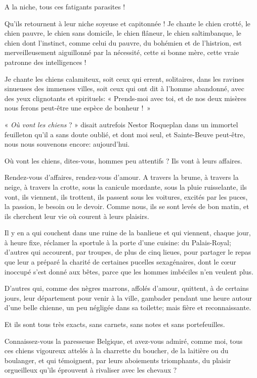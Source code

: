 A la niche, tous ces fatigants parasites !

Qu’ils retournent à leur niche soyeuse et capitonnée !
Je chante le chien crotté, le chien pauvre, le chien sans domicile, le
chien flâneur, le chien saltimbanque, le chien dont
l’instinct, comme celui du pauvre, du bohémien et de
l’histrion, est merveilleusement aiguillonné par la
nécessité, cette si bonne mère, cette vraie patronne des intelligences
!

Je chante les chiens calamiteux, soit ceux qui errent, solitaires, dans
les ravines sinueuses des immenses villes, soit ceux qui ont dit à
l’homme abandonné, avec des yeux clignotants et
spirituels: « Prends{}-moi avec toi, et de nos deux misères nous ferons
peut{}-être une espèce de bonheur !~»

« \textit{Où vont les chiens} ? » disait autrefois Nestor Roqueplan dans un
immortel feuilleton qu’il a sans doute oublié, et dont
moi seul, et Sainte{}-Beuve peut{}-être, nous nous souvenons encore:
aujourd’hui.

Où vont les chiens, dites{}-vous, hommes peu attentifs ? Ils vont à
leurs affaires.

Rendez{}-vous d’affaires, rendez{}-vous
d’amour. A travers la brume, à travers la neige, à
travers la crotte, sous la canicule mordante, sous la pluie
ruisselante, ils vont, ils viennent, ils trottent, ils passent sous les
voitures, excités par les puces, la passion, le besoin ou le devoir.
Comme nous, ils se sont levés de bon matin, et ils cherchent leur vie
où courent à leurs plaisirs.

Il y en a qui couchent dans une ruine de la banlieue et qui viennent,
chaque jour, à heure fixe, réclamer la sportule à la porte
d’une cuisine: du Palais{}-Royal;
d’autres qui accourent, par troupes, de plus de cinq
lieues, pour partager le repas que leur a préparé la charité de
certaines pucelles sexagénaires, dont le c\oe ur inoccupé
s’est donné aux bêtes, parce que les hommes imbéciles
n’en veulent plus.

D’autres qui, comme des nègres marrons, affolés
d’amour, quittent, à de certains jours, leur
département pour venir à la ville, gambader pendant une heure autour
d’une belle chienne, un peu négligée dans sa toilette;
mais fière et reconnaissante.

Et ils sont tous très exacts, sans carnets, sans notes et sans
portefeuilles.

Connaissez{}-vous la paresseuse Belgique, et avez{}-vous admiré, comme
moi, tous ces chiens vigoureux attelés à la charrette du boucher, de la
laitière ou du boulanger, et qui témoignent, par leurs aboiements
triomphants, du plaisir orgueilleux qu’ils éprouvent à
rivaliser avec les chevaux ?

